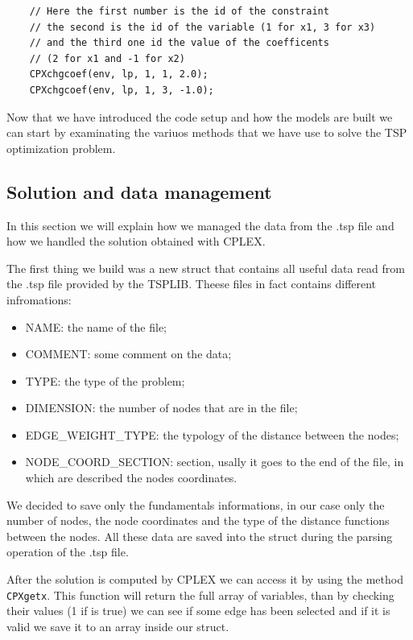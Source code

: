 \begin{lstlisting}
	// Here the first number is the id of the constraint
	// the second is the id of the variable (1 for x1, 3 for x3)
	// and the third one id the value of the coefficents
	// (2 for x1 and -1 for x2)
	CPXchgcoef(env, lp, 1, 1, 2.0);
	CPXchgcoef(env, lp, 1, 3, -1.0);
\end{lstlisting}

Now that we have introduced the code setup and how the models are built we can start by examinating the variuos methods that we have use to solve the TSP optimization problem.

\subsection{Solution and data management}
\label{sec:sol_management}
In this section we will explain how we managed the data from the .tsp file and how we handled the solution obtained with CPLEX.

The first thing we build was a new struct that contains all useful data read from the .tsp file provided by the TSPLIB. Theese files in fact contains different infromations:

\begin{itemize}
	\item NAME: the name of the file;
	\item COMMENT: some comment on the data;
	\item TYPE: the type of the problem;
	\item DIMENSION: the number of nodes that are in the file;
	\item EDGE\_WEIGHT\_TYPE: the typology of the distance between the nodes;
	\item NODE\_COORD\_SECTION: section, usally it goes to the end of the file, in which are described the nodes coordinates.
\end{itemize}

We decided to save only the fundamentals informations, in our case only the number of nodes, the node coordinates and the type of the distance functions between the nodes. All these data are saved into the struct during the parsing operation of the .tsp file.

After the solution is computed by CPLEX we can access it by using the method \verb|CPXgetx|. This function will return the full array of variables, than by checking their values (1 if is true) we can see if some edge has been selected and if it is valid we save it to an array inside our struct.

